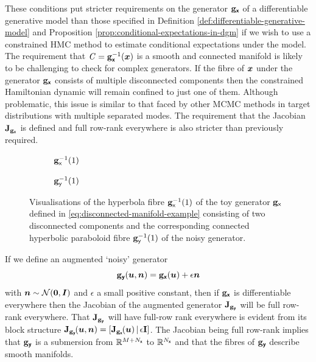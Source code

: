 These conditions put stricter requirements on the generator ${\mathbf{g}}_{\boldsymbol{\mathsf{x}}}$ of a differentiable generative model than those specified in Definition \ref{def:differentiable-generative-model} and Proposition \ref{prop:conditional-expectations-in-dgm} if we wish to use a constrained \ac{HMC} method to estimate conditional expectations under the model. The requirement that $\mathit{C} = {\mathbf{g}}_{\boldsymbol{\mathsf{x}}}^{-1}(\boldsymbol{x})$ is a smooth and connected manifold is likely to be challenging to check for complex generators. If the fibre of $\boldsymbol{x}$ under the generator ${\mathbf{g}}_{\boldsymbol{\mathsf{x}}}$ consists of multiple disconnected components then the constrained Hamiltonian dynamic will remain confined to just one of them. Although problematic, this issue is similar to that faced by other \ac{MCMC} methods in target distributions with multiple separated modes. The requirement that the Jacobian $\mathbf{J}_{{\mathbf{g}}_{\boldsymbol{\mathsf{x}}}}$ is defined and full row-rank everywhere is also stricter than previously required.

\begin{figure}[t]
\begin{subfigure}[b]{0.48\linewidth}
\centering
  \caption{${\mathbf{g}}_{\mathsf{x}}^{-1}(1)$}
  \label{sfig:disconnected-manifold-example-orig}
\end{subfigure}
\begin{subfigure}[b]{0.48\linewidth}
\centering
  \caption{${\mathbf{g}}_{\mathsf{y}}^{-1}(1)$}
  \label{sfig:disconnected-manifold-example-noisy}
\end{subfigure}
\caption[Disconnected manifold example.]{Visualisations of the hyperbola fibre ${\mathbf{g}}_{\mathsf{x}}^{-1}(1)$ of the toy generator ${\mathbf{g}}_{\mathsf{x}}$ defined in \eqref{eq:disconnected-manifold-example} consisting of two disconnected components and the corresponding connected hyperbolic paraboloid fibre ${\mathbf{g}}_{\mathsf{y}}^{-1}(1)$ of the noisy generator.}
\label{fig:disconnected-manifold-example}
\end{figure}

If we define an augmented `noisy' generator
\begin{equation}
  {\mathbf{g}}_{\boldsymbol{\mathsf{y}}}(\boldsymbol{u},\boldsymbol{n}) = {\mathbf{g}}_{\boldsymbol{\mathsf{x}}}(\boldsymbol{u}) + \epsilon \boldsymbol{n}
\end{equation}
with $\vct{n} \sim \nrm{\vct{0},\mtx{I}}$ and $\epsilon$ a small positive constant, then if ${\mathbf{g}}_{\boldsymbol{\mathsf{x}}}$ is differentiable everywhere then the Jacobian of the augmented generator $\mathbf{J}_{{\mathbf{g}}_{\boldsymbol{\mathsf{y}}}}$ will be full row-rank everywhere. That $\mathbf{J}_{{\mathbf{g}}_{\boldsymbol{\mathsf{y}}}}$ will have full-row rank everywhere is evident from its block structure $\jacob{\genfunc_{\rvct{y}}}{\vct{u},\vct{n}} = \lsb \jacob{\genfunc_{\rvct{x}}}{\vct{u}} \,\middle|\, \epsilon\idmtx \rsb$. The Jacobian being full row-rank implies that ${\mathbf{g}}_{\boldsymbol{\mathsf{y}}}$ is a submersion from $\mathbb{R}^{M + N_{\boldsymbol{\mathsf{x}}}}$ to $\mathbb{R}^{N_{\boldsymbol{\mathsf{x}}}}$ and that the fibres of ${\mathbf{g}}_{\boldsymbol{\mathsf{y}}}$ describe smooth manifolds. 


